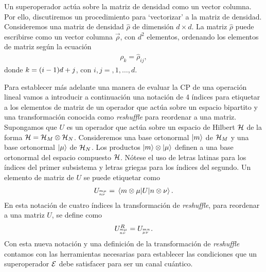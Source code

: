 Un superoperador actúa sobre la matriz de densidad 
como un vector columna. Por ello, discutiremos un procedimiento 
para `vectorizar' a la matriz de densidad.
Consideremos una matriz de densidad $\hat{\rho}$ de dimensión $d\times d$.
La matriz $\hat{\rho}$ puede escribirse como 
un vector columna $\vec{\rho}$, con $d^2$ elementos, 
ordenando los elementos de matriz según la ecuación  
\begin{align}
\rho_k=\hat{\rho}_{ij}, 
\label{eq:matrix-to-vector}
\end{align}
donde $k=\qty(i-1)d+j$, con $i,j=,1,\ldots,d$. 

Para establecer más adelante una manera de evaluar la CP de una operación 
lineal vamos a introducir a continuación una notación de 4 índices para 
etiquetar a los elementos de matriz de un operador que actúa 
sobre un espacio bipartito y una transformación conocida como 
\textit{reshuffle} para reordenar a una matriz. 
Supongamos que $U$ es un operador 
que actúa sobre un espacio de Hilbert 
$\mathcal{H}$ de la forma $\mathcal{H}=\mathcal{H}_M\otimes\mathcal{H}_N$.
Consideremos una base ortonormal $\ket{m}$ de $\mathcal{H}_M$ 
y una base ortonormal $\ket{\mu}$ de $\mathcal{H}_N$. 
Los productos $\ket{m}\otimes\ket{\mu}$ definen a una base
ortonormal del espacio compuesto $\mathcal{H}$. 
Nótese el uso de letras latinas para los índices del
primer subsistema y letras griegas para los índices del segundo. 
Un elemento de matriz de $U$ se puede etiquetar como
\begin{align}
U_\ind{m\mu}{n\nu}=\matrixel{m\otimes \mu}{U}{n\otimes \nu}.
\label{eq:4indices}
\end{align}
En esta notación de cuatro índices la transformación de \textit{reshuffle}, 
para reordenar a una matriz  $U$, se define 
como~\cite{bengtsson_zyczkowski_2017}
\begin{align}
U^R_{{}^{m\mu}_{n\nu}} = U_{{}^{mn}_{\mu\nu}}.
\label{eq:R-4ind}
\end{align}
Con esta nueva notación y una definición de 
la transformación de \textit{reshuffle}
contamos con las herramientas necesarias para establecer 
las condiciones que un superoperador $\mathcal{E}$ debe satisfacer 
para ser un canal cuántico.

